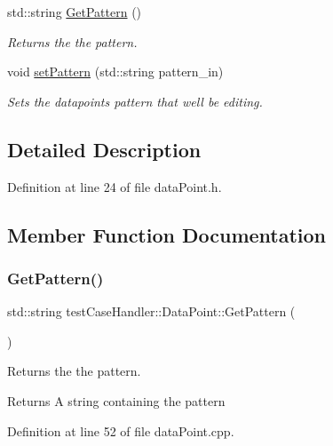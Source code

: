 \begin{DoxyCompactItemize}
std\+::string \mbox{\hyperlink{classtestCaseHandler_1_1DataPoint_a3abb7b0c714a11e5dc5c1c9a14c39c04}{Get\+Pattern}} ()
\begin{DoxyCompactList}\small\item\em Returns the the pattern. \end{DoxyCompactList}\item 
void \mbox{\hyperlink{classtestCaseHandler_1_1DataPoint_a879b81d28cb15fd6e92179e183e0d678}{set\+Pattern}} (std\+::string pattern\+\_\+in)
\begin{DoxyCompactList}\small\item\em Sets the datapoints pattern that we\textquotesingle{}ll be editing. \end{DoxyCompactList}\end{DoxyCompactItemize}


\subsection{Detailed Description}


Definition at line 24 of file data\+Point.\+h.



\subsection{Member Function Documentation}
\mbox{\label{classtestCaseHandler_1_1DataPoint_a3abb7b0c714a11e5dc5c1c9a14c39c04}} 
\subsubsection{\texorpdfstring{GetPattern()}{GetPattern()}}
{\footnotesize\ttfamily std\+::string test\+Case\+Handler\+::\+Data\+Point\+::\+Get\+Pattern (\begin{DoxyParamCaption}{ }\end{DoxyParamCaption})}



Returns the the pattern. 

\begin{DoxyReturn}{Returns}
A string containing the pattern 
\end{DoxyReturn}


Definition at line 52 of file data\+Point.\+cpp.


